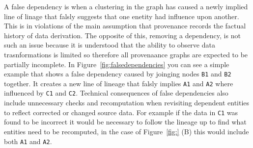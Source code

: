 A false dependency is when a clustering in the graph has caused a newly implied line of linage that falsly suggests that one enetity had influence upon another. This is in violations of the main assumption that provenance records the factual history of data derivation. The opposite of this, removing a dependency, is not such an issue because it is understood that the ability to observe data trasnformations is limited so therefore all provenaance graphs are expected to be partially incomplete. In Figure~\ref{fig:falsedependencies} you can see a simple example that shows a false dependency caused by joinging nodes \texttt{B1} and \texttt{B2} together. It creates a new line of lineage that falsly implies \texttt{A1} and \texttt{A2} where influenced by \texttt{C1} and \texttt{C2}. Technical consequences of false dependencies also include unnecessary checks and recomputation when revisiting dependent entities to reflect corrected or changed source data. For example if the data in \texttt{C1} was found to be incorrect it would be necessary to follow the lineage up to find what entities need to be recomputed, in the case of Figure~\ref{fig:} (B) this would include both \texttt{A1} and \texttt{A2}.

